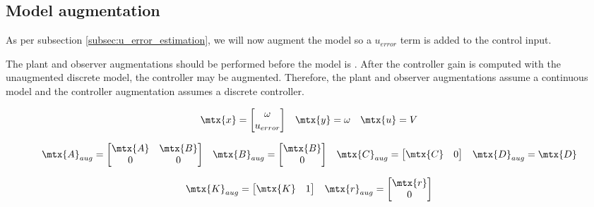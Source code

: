 \subsection{Model augmentation}

As per subsection \ref{subsec:u_error_estimation}, we will now augment the
\gls{model} so a $u_{error}$ term is added to the \gls{control input}.

The \gls{plant} and \gls{observer} augmentations should be performed before the
\gls{model} is . After the \gls{controller}
gain is computed with the unaugmented discrete \gls{model}, the controller may
be augmented. Therefore, the \gls{plant} and \gls{observer} augmentations assume
a continuous \gls{model} and the \gls{controller} augmentation assumes a
discrete \gls{controller}.

\begin{equation*}
  \begin{array}{ccc}
    \mtx{x} =
    \begin{bmatrix}
      \omega \\
      u_{error}
    \end{bmatrix} &
    \mtx{y} = \omega &
    \mtx{u} = V
  \end{array}
\end{equation*}

\begin{equation}
  \begin{array}{cccc}
    \mtx{A}_{aug} =
    \begin{bmatrix}
      \mtx{A} & \mtx{B} \\
      0 & 0
    \end{bmatrix} &
    \mtx{B}_{aug} =
    \begin{bmatrix}
      \mtx{B} \\
      0
    \end{bmatrix} &
    \mtx{C}_{aug} = \begin{bmatrix}
      \mtx{C} & 0
    \end{bmatrix} &
    \mtx{D}_{aug} = \mtx{D}
  \end{array}
\end{equation}

\begin{equation}
  \begin{array}{cc}
    \mtx{K}_{aug} = \begin{bmatrix}
      \mtx{K} & 1
    \end{bmatrix} &
    \mtx{r}_{aug} = \begin{bmatrix}
      \mtx{r} \\
      0
    \end{bmatrix}
  \end{array}
\end{equation}

